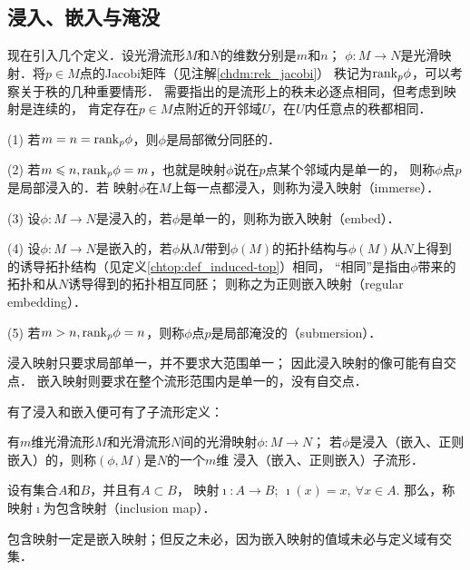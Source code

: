 \subsection{浸入、嵌入与淹没}\label{chdm:sec_immerse-embed}
现在引入几个定义．设光滑流形$M$和$N$的维数分别是$m$和$n$；
$\phi:M\to N$是光滑映射．将$p\in M$点的Jacobi矩阵（见注解\ref{chdm:rek_jacobi}）
秩记为${\rm rank}_p \phi$，可以考察关于秩的几种重要情形．
需要指出的是流形上的秩未必逐点相同，但考虑到映射是连续的，
肯定存在$p\in M$点附近的开邻域$U$，在$U$内任意点的秩都相同．

(1) 若$m=n={\rm rank}_p\phi$，则$\phi$是局部微分同胚的．

(2) 若$m\leqslant n, {\rm rank}_p\phi=m$，也就是映射$\phi$说在$p$点某个邻域内是单一的，
则称$\phi$点$p$是{\heiti 局部浸入}的．若
映射$\phi$在$M$上每一点都浸入，则称为{\heiti 浸入映射}（immerse）．

(3) 设$\phi:M\to N$是浸入的，若$\phi$是单一的，则称为{\heiti 嵌入映射}（embed）．

(4) 设$\phi:M\to N$是嵌入的，若$\phi$从$M$带到$\phi(M)$的拓扑结构与$\phi(M)$从$N$上得到
的诱导拓扑结构（见定义\ref{chtop:def_induced-top}）相同，
“相同”是指由$\phi$带来的拓扑和从$N$诱导得到的拓扑相互同胚；
则称之为{\heiti 正则嵌入映射}（regular embedding）．

(5) 若$m> n, {\rm rank}_p\phi=n$，则称$\phi$点$p$是{\heiti 局部淹没}的（submersion）．


浸入映射只要求局部单一，并不要求大范围单一；
因此浸入映射的像可能有自交点．
嵌入映射则要求在整个流形范围内是单一的，没有自交点．


有了浸入和嵌入便可有了子流形定义：
\begin{definition}
    有$m$维光滑流形$M$和光滑流形$N$间的光滑映射$\phi:M\to N$；
    若$\phi$是浸入（嵌入、正则嵌入）的，则称$(\phi,M)$是$N$的一个$m$维
    {\heiti 浸入（嵌入、正则嵌入）子流形}．
\end{definition}


\begin{definition}\label{chdm:def_inclusion-map}
    设有集合$A$和$B$，并且有$A\subset B$，
    映射$\imath: A\to B;\ \imath(x) = x, \ \forall x\in A. $
    那么，称映射$\imath$为{\heiti 包含映射}（inclusion map）．
\end{definition}
包含映射一定是嵌入映射；但反之未必，因为嵌入映射的值域未必与定义域有交集．

